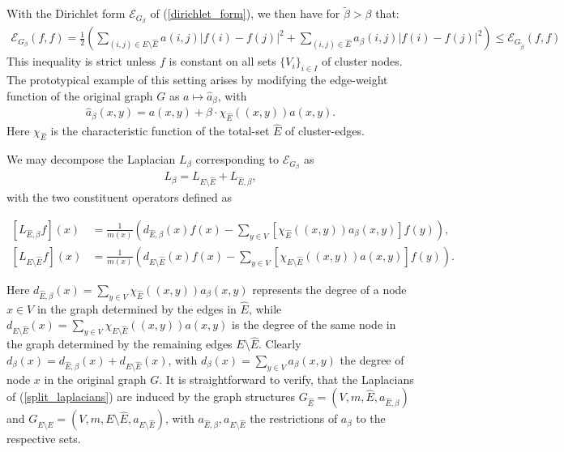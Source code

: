 \documentclass[reqno,12pt,letterpaper]{amsart}
\numberwithin{equation}{section}
\newcommand{\1}{\mathds{1}}
\theoremstyle{definition}
\begin{document}
\medskip

		With the Dirichlet form $	\mathcal{E}_{G_\beta}$ of (\ref{dirichlet_form}), we then have 	for $\tilde{\beta} > \beta$  that:
	\begin{align}\label{def_quadratic_form}
			\mathcal{E}_{G_\beta}(f,f) =  \frac12 \left(\sum\limits_{(i,j) \in E \setminus \hat{E}} a(i,j) |f(i) - f(j)|^2 +   \sum\limits_{(i,j) \in  \hat{E}} a_\beta(i,j) |f(i) - f(j)|^2 \right)\leq  	\mathcal{E}_{G_{\tilde{\beta}}}(f,f)
	\end{align}
This inequality is strict unless $f$ is constant on all  sets $\{V_i\}_{i \in I}$ of cluster nodes.
The prototypical example of this setting arises by modifying the edge-weight function of the original graph $G$ as $a \mapsto \hat{a}_\beta$, with 
\begin{align}\label{prototypical_example}
\hat{a}_{\beta}(x,y) =  a(x,y) + \beta\cdot \chi_{\hat{E}}((x,y)) a(x,y).
\end{align}
Here $\chi_{\hat{E}}$ is the characteristic function of the total-set $\hat{E}$ of cluster-edges.
	\medskip


	

We may decompose the  Laplacian
$L_\beta$ corresponding to $\mathcal{E}_{G_\beta}$ as 
\begin{align}\label{original_decomposition}
	L_\beta = L_{E \setminus \hat{E}} +  L_{\hat{E},\beta},
\end{align}
with the two constituent operators defined as

	\begin{align}\label{split_laplacians}
		[L_{\hat{E},\beta} f](x) &= \frac{1}{m(x)} \left(d_{\hat{E},\beta}(x)  f(x)   - \sum\limits_{y \in V}[\chi_{\hat{E}}((x,y)) a_\beta(x,y)] f(y) \right), \\
		[L_{E \setminus \hat{E}} f](x) &= \frac{1}{m(x)} \left(d_{E \setminus \hat{E}}(x)  f(x)   - \sum\limits_{y \in V}[\chi_{E \setminus \hat{E}}((x,y)) a(x,y)] f(y) \right). 
	\end{align}



Here $d_{\hat{E},\beta}(x) = \sum_{y \in V} \chi_{\hat{E}}((x,y)) a_\beta(x,y)$ represents the degree of a node $x \in V$ in the graph determined by the edges in $\hat{E}$, while $d_{E\setminus \hat{E}}(x) = \sum_{y \in V} \chi_{E\setminus\hat{E}}((x,y)) a(x,y)$ is the degree of the same node in the graph determined by the remaining edges $E \setminus \hat{E}$. Clearly $d_\beta(x) = d_{\hat{E},\beta}(x)  + d_{E\setminus \hat{E}}(x)$, with $d_\beta(x) = \sum_{y \in V} a_\beta(x,y)$ the degree of node $x$ in the original graph $G$. It is straightforward to verify, that
	the Laplacians of (\ref{split_laplacians}) are induced by the graph structures $G_{\hat{E}} = (V, m, \hat{E}, a_{\hat{E},\beta})$ and $G_{E \setminus \hat{E}} = (V, m, E\setminus \hat{E}, a_{E\setminus \hat{E}})$, with $a_{ \hat{E}, \beta}, a_{E\setminus \hat{E}}$ the restrictions of $a_{\beta}$ to the respective sets. 	
\end{document}
